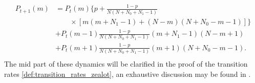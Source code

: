 \documentclass[12pt,a4paper,twoside]{article}
\begin{document}
\begin{align}\label{eq:chinellato_dynamics}
	\begin{split}
	\begin{aligned}
		P_{t+1}\left(m\right) &= P_t\left(m\right)\lbrace p +\frac{1-p}{N\left(N+N_0+N_1-1\right)}\\
		&\qquad \times\left[m\left(m+N_1-1\right) +\left(N-m\right)\left(N+N_0-m-1\right)\right]\rbrace\\
		&+P_t\left(m-1\right)\frac{1-p}{N\left(N+N_0+N_1-1\right)}\left(m+N_1-1\right)\left(N-m+1\right)\\
		&+P_t\left(m+1\right)\frac{1-p}{N\left(N+N_0+N_1-1\right)}\left(m+1\right)\left(N+N_0-m-1\right).
	\end{aligned}
	\end{split}
\end{align}
The mid part of these dynamics will be clarified in the proof of the transition rates \eqref{def:transition_rates_zealot}, an exhaustive discussion may be found in \cite{Aguiar2011, Chinellato2015}. 
\end{document}
